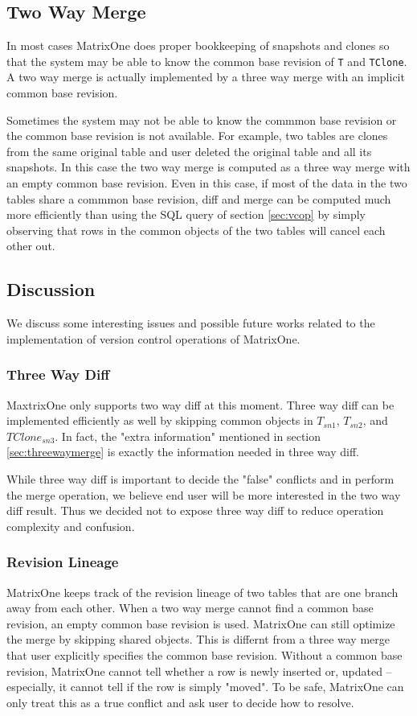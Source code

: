 \documentclass[sigconf,nonacm]{acmart} %
\begin{document}
\subsection{Two Way Merge}
In most cases MatrixOne does proper bookkeeping of snapshots and clones so that 
the system may be able to know the common base revision of \texttt{T} 
and \texttt{TClone}.  A two way merge is actually implemented by a three way 
merge with an implicit common base revision.

Sometimes the system may not be able to know the commmon base revision or 
the common base revision is not available.  For example, two tables are clones 
from the same original table and user deleted the original table and 
all its snapshots.  In this case the two way merge is computed as a three way
merge with an empty common base revision.  Even in this case, if most of the 
data in the two tables share a commmon base revision, diff and merge 
can be computed much more efficiently than using the SQL query of 
section \ref{sec:vcop} by simply observing that rows in the common objects 
of the two tables will cancel each other out.

\subsection{Discussion} \label{sec:discussion}
We discuss some interesting issues and possible future works related to 
the implementation of version control operations of MatrixOne.

\subsubsection{Three Way Diff}
MaxtrixOne only supports two way diff at this moment.  Three way diff can
be implemented efficiently as well by skipping common objects in $T_{sn1}$, 
$T_{sn2}$, and $TClone_{sn3}$.  In fact, the "extra information" mentioned 
in section \ref{sec:threewaymerge} is exactly the information needed in
three way diff.

While three way diff is important to decide the "false" conflicts and 
in perform the merge operation, we believe end user will be more 
interested in the two way diff result.   Thus we decided not to 
expose three way diff to reduce operation complexity and confusion.

\subsubsection{Revision Lineage}
MatrixOne keeps track of the revision lineage of two tables that are one 
branch away from each other.  When a two way merge cannot find a common 
base revision, an empty common base revision is used.  MatrixOne can 
still optimize the merge by skipping shared objects.  This is differnt 
from a three way merge that user explicitly specifies the common base revision.
Without a common base revision, MatrixOne cannot tell whether a row is newly 
inserted or, updated -- especially, it cannot tell if the row is simply "moved".
To be safe, MatrixOne can only treat this as a true conflict and ask 
user to decide how to resolve.
\end{document}
